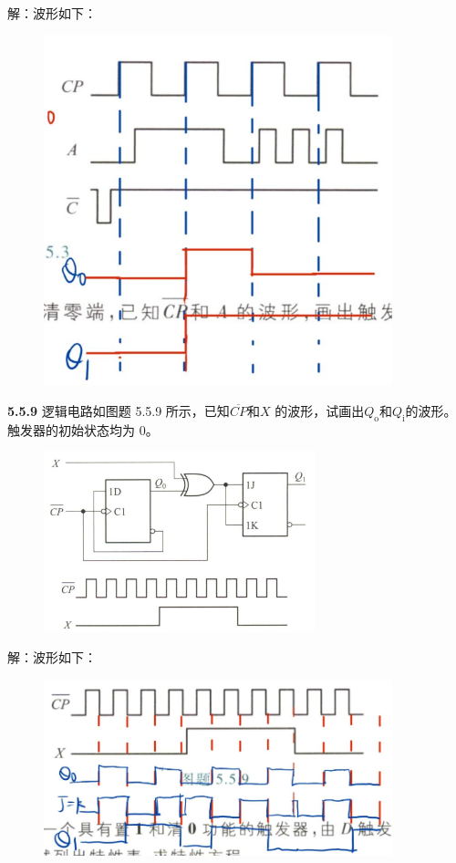 \documentclass[a4paper,11pt,UTF8]{article}
\begin{document}
解：波形如下：
\begin{figure}[H]
	\centering
	\includegraphics[width=0.9\textwidth]{5.5.3_1}
\end{figure}
\textbf{5.5.9} 逻辑电路如图题 5.5.9 所示，已知$\overline{CP}$和$X$ 的波形，试画出$Q_{\mathrm{o}}$和$Q_{\mathrm{i}}$的波形。触发器的初始状态均为 0。
\begin{figure}[H]
	\centering
	\includegraphics[width=0.7\textwidth]{5.5.9}
\end{figure}
解：波形如下：
\begin{figure}[H]
	\centering
	\includegraphics[width=0.9\textwidth]{5.5.9_1}
\end{figure}\newpage
\end{document}
